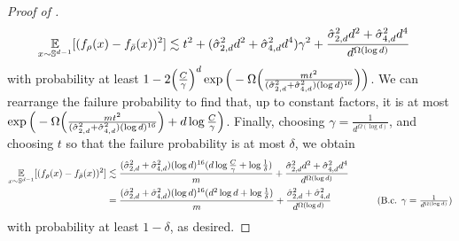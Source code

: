 \begin{proof} [Proof of ]
\begin{align}
\operatorname*{\mathbb{E}}_{x \sim \mathbb{S}^{d - 1}} [(f_\rho(x) - f_{{\bar{\rho}}}(x))^2]
& \lesssim t^2 + (\hat{\sigma}_{2, d}^2 d^2 + \hat{\sigma}_{4, d}^2 d^4) \gamma^2 + \frac{\hat{\sigma}_{2, d}^2 d^2 + \hat{\sigma}_{4, d}^2 d^4}{d^{\Omega(\log d)}}
\end{align}
with probability at least $1 - 2 \Big(\frac{C}{\gamma}\Big)^d \exp\Big(-\Omega\Big(\frac{mt^2}{(\hat{\sigma}_{2, d}^2 + \hat{\sigma}_{4, d}^2) (\log d)^{16}}\Big)\Big)$. We can rearrange the failure probability to find that, up to constant factors, it is at most $\exp\Big(-\Omega\Big(\frac{mt^2}{(\hat{\sigma}_{2, d}^2 + \hat{\sigma}_{4, d}^2) (\log d)^{16}}\Big) + d \log \frac{C}{\gamma} \Big)$. Finally, choosing $\gamma = \frac{1}{d^{\Omega(\log d)}}$, and choosing $t$ so that the failure probability is at most $\delta$, we obtain
\begin{align}
\E_{x \sim \bbS^{d - 1}} [(f_\rho(x) - f_{\rhobar}(x))^2]
& \lesssim \frac{(\sigmaCoeffTwo^2 + \sigmaCoeffFour^2) (\log d)^{16} (d \log \frac{C}{\gamma} + \log \frac{1}{\delta})}{m} + \frac{\sigmaCoeffTwo^2 d^2 + \sigmaCoeffFour^2 d^4}{d^{\Omega(\log d)}} \\
& = \frac{(\sigmaCoeffTwo^2 + \sigmaCoeffFour^2) (\log d)^{16} (d^2 \log d + \log \frac{1}{\delta})}{m} + \frac{\sigmaCoeffTwo^2 + \sigmaCoeffFour^2}{d^{\Omega(\log d)}}
& \tag{B.c. $\gamma = \frac{1}{d^{\Omega(\log d)}}$}
\end{align}
with probability at least $1 - \delta$, as desired.
\end{proof}

